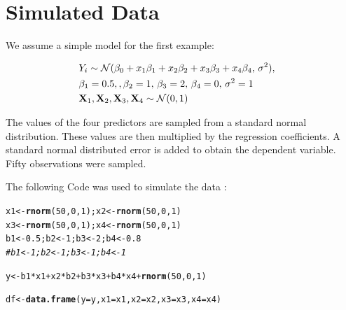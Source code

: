 \documentclass[11pt,a4paper,twoside]{book}\usepackage[]{graphicx}\usepackage[]{color}
\makeatletter
\newcommand{\hlnum}[1]{\textcolor[rgb]{0.686,0.059,0.569}{#1}}%
\newcommand{\hlcom}[1]{\textcolor[rgb]{0.678,0.584,0.686}{\textit{#1}}}%
\newcommand{\hlopt}[1]{\textcolor[rgb]{0,0,0}{#1}}%
\newcommand{\hlstd}[1]{\textcolor[rgb]{0.345,0.345,0.345}{#1}}%
\newcommand{\hlkwb}[1]{\textcolor[rgb]{0.69,0.353,0.396}{#1}}%
\newcommand{\hlkwc}[1]{\textcolor[rgb]{0.333,0.667,0.333}{#1}}%
\newcommand{\hlkwd}[1]{\textcolor[rgb]{0.737,0.353,0.396}{\textbf{#1}}}%
\newenvironment{kframe}{%
 \def\at@end@of@kframe{}%
 \ifinner\ifhmode%
  \def\at@end@of@kframe{\end{minipage}}%
  \begin{minipage}{\columnwidth}%
 \fi\fi%
 \def\FrameCommand##1{\hskip\@totalleftmargin \hskip-\fboxsep
 \colorbox{shadecolor}{##1}\hskip-\fboxsep
     \hskip-\linewidth \hskip-\@totalleftmargin \hskip\columnwidth}%
 \MakeFramed {\advance\hsize-\width
   \@totalleftmargin\z@ \linewidth\hsize
   \@setminipage}}%
 {\par\unskip\endMakeFramed%
 \at@end@of@kframe}
\newenvironment{knitrout}{}{} %
\makeatother
\begin{document}
\section{Simulated Data}

We assume a simple model for the first example: 

\begin{align*} 
&Y_{i} \sim \mathcal{N}(\beta_{0}+x_{1} \beta_{1}+x_{2} \beta_{2}+x_{3} \beta_{3}+x_{4} \beta_{4}, \, \sigma^2),& \\ & \beta_{1} = 0.5, , \beta_{2} = 1, \, \beta_{3} = 2 , \, \beta_{4}=0, \, \sigma^2 = 1 & \\ & {\mathbf{X}}_{1}, {\mathbf{X}}_{2},{\mathbf{X}}_{3},{\mathbf{X}}_{4} \sim \mathcal{N}(0, 1) 
\end{align*} 

The values of the four predictors are sampled from a standard normal distribution. These values are then multiplied by the regression coefficients. A standard normal distributed error is added to obtain the dependent variable. Fifty observations were sampled.

The following Code was used to simulate the data :

\begin{knitrout}
\color{fgcolor}\begin{kframe}
\begin{alltt}
\hlstd{x1} \hlkwb{<-} \hlkwd{rnorm}\hlstd{(}\hlnum{50}\hlstd{,} \hlnum{0}\hlstd{,} \hlnum{1}\hlstd{); x2} \hlkwb{<-} \hlkwd{rnorm}\hlstd{(}\hlnum{50}\hlstd{,} \hlnum{0}\hlstd{,} \hlnum{1}\hlstd{)}
\hlstd{x3} \hlkwb{<-} \hlkwd{rnorm}\hlstd{(}\hlnum{50}\hlstd{,} \hlnum{0}\hlstd{,} \hlnum{1}\hlstd{); x4} \hlkwb{<-} \hlkwd{rnorm}\hlstd{(}\hlnum{50}\hlstd{,} \hlnum{0}\hlstd{,} \hlnum{1}\hlstd{)}
\hlstd{b1} \hlkwb{<-} \hlnum{0.5}\hlstd{; b2} \hlkwb{<-} \hlnum{1}\hlstd{; b3} \hlkwb{<-} \hlnum{2}\hlstd{; b4} \hlkwb{<-} \hlnum{0.8}
\hlcom{#b1 <- 1; b2 <- 1; b3 <- 1; b4 <- 1}

\hlstd{y} \hlkwb{<-} \hlstd{b1}\hlopt{*}\hlstd{x1} \hlopt{+} \hlstd{x2}\hlopt{*}\hlstd{b2} \hlopt{+} \hlstd{b3}\hlopt{*}\hlstd{x3} \hlopt{+} \hlstd{b4}\hlopt{*}\hlstd{x4} \hlopt{+} \hlkwd{rnorm}\hlstd{(}\hlnum{50}\hlstd{,} \hlnum{0}\hlstd{,} \hlnum{1}\hlstd{)}

\hlstd{df} \hlkwb{<-} \hlkwd{data.frame}\hlstd{(}\hlkwc{y} \hlstd{= y,} \hlkwc{x1} \hlstd{= x1,} \hlkwc{x2} \hlstd{= x2,} \hlkwc{x3} \hlstd{= x3,} \hlkwc{x4} \hlstd{= x4)}
\end{alltt}
\end{kframe}
\end{knitrout}
\end{document}

